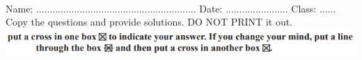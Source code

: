\documentclass{article}
\date{}
\begin{document}
\fontsize{13}{15} \selectfont %

\begin{center}
  \qquad \\ 
\vspace{5pt}

Name: ...........................................................  \hspace{0.5cm}  Date: ....................... \hspace{0.5cm}  Class: ......\hspace{0.5cm} \\
\vspace{5pt}
    Copy the questions and provide solutions. DO NOT PRINT it out.  \\
\vspace{5pt}
    \includegraphics[width=15cm]{Year_6_Mixed_Tests/Xx.png}
\end{center}
\end{document}
